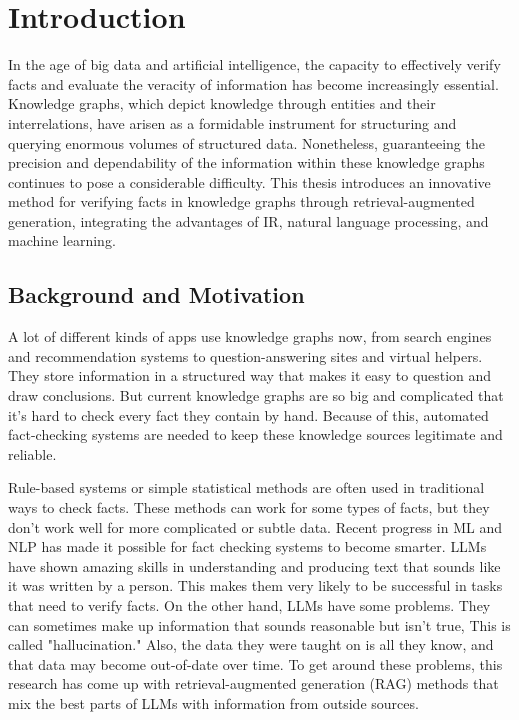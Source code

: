 \chapter{Introduction}\label{ch:intro}
In the age of big data and artificial intelligence, the capacity to effectively verify facts and evaluate the veracity of information has become increasingly essential.
Knowledge graphs, which depict knowledge through entities and their interrelations, have arisen as a formidable instrument for structuring and querying enormous volumes of structured data.
Nonetheless, guaranteeing the precision and dependability of the information within these knowledge graphs continues to pose a considerable difficulty.
This thesis introduces an innovative method for verifying facts in knowledge graphs through retrieval-augmented generation, integrating the advantages of \ac{IR}, natural language processing, and machine learning.

\section{Background and Motivation}\label{sec:background}
A lot of different kinds of apps use knowledge graphs now, from search engines and recommendation systems to question-answering sites and virtual helpers.
They store information in a structured way that makes it easy to question and draw conclusions.
But current knowledge graphs are so big and complicated that it's hard to check every fact they contain by hand.
Because of this, automated fact-checking systems are needed to keep these knowledge sources legitimate and reliable.

Rule-based systems or simple statistical methods are often used in traditional ways to check facts.
These methods can work for some types of facts, but they don't work well for more complicated or subtle data.
Recent progress in \ac{ML} and \ac{NLP} has made it possible for fact checking systems to become smarter.
\ac{LLMs} have shown amazing skills in understanding and producing text that sounds like it was written by a person.
This makes them very likely to be successful in tasks that need to verify facts.
On the other hand, LLMs have some problems.
They can sometimes make up information that sounds reasonable but isn't true, This is called "hallucination."
Also, the data they were taught on is all they know, and that data may become out-of-date over time.
To get around these problems, this research has come up with retrieval-augmented generation (RAG) methods that mix the best parts of LLMs with information from outside sources.

